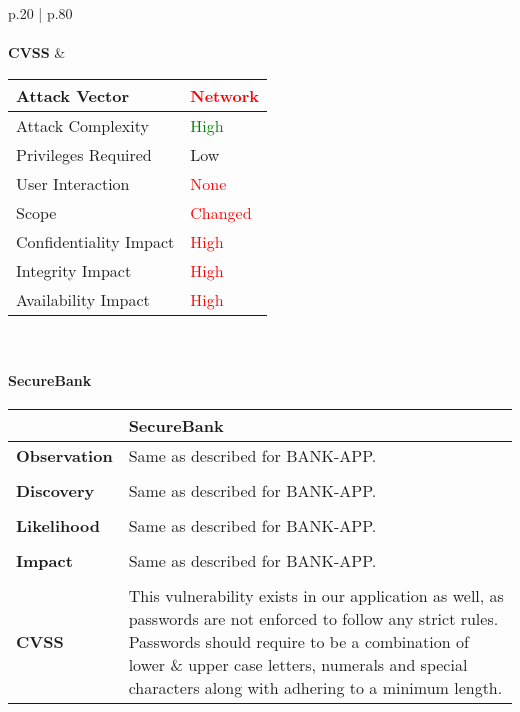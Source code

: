 \begin{longtable*}{p{.20\textwidth} | p{.80\textwidth}}
    \\\\
    \textbf{CVSS} &
      \begin{tabular}{| l | l |}
      \hline
      Attack Vector		& \textcolor{red}{Network}\\
      \hline
      Attack Complexity	& \textcolor{Green}{High} \\
      \hline
      Privileges Required & \textcolor{BurntOrange}{Low} \\
      \hline
      User Interaction	& \textcolor{red}{None} \\
      \hline
      Scope		& \textcolor{red}{Changed} \\
      \hline
      Confidentiality Impact	& \textcolor{red}{High} \\
      \hline
      Integrity Impact		& \textcolor{red}{High} \\
      \hline
      Availability Impact		& \textcolor{red}{High} \\
      \hline
      \end{tabular}
    \\
    \hline
\end{longtable*}
\paragraph{SecureBank} \mbox{}
\begin{longtable*}{p{.20\textwidth} | p{.80\textwidth}}
    \hline
    & \textbf{SecureBank} \\
    \hline
    \textbf{Observation} &
       Same as described for BANK-APP.
    \\\\
    \textbf{Discovery} &
    Same as described for BANK-APP.
    \\\\
    \textbf{Likelihood} &
        Same as described for BANK-APP.
    \\\\
    \textbf{Impact} &
        Same as described for BANK-APP.
    \\\\
    \textbf{CVSS} &
        This vulnerability exists in our application as well, as passwords are not enforced to follow any strict rules. Passwords should require to be a combination of lower \& upper case letters, numerals and special characters along with adhering to a minimum length.
    \\
    \hline
\end{longtable*}
\clearpage
